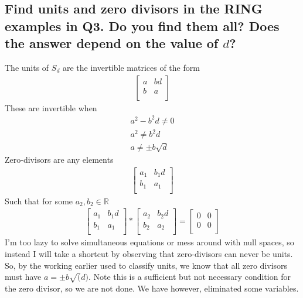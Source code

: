 \documentclass{article}
\begin{document}
\subsection*{Find units and zero divisors in the RING examples in Q3. Do you find them all? Does the answer depend on the value of \(d\)?}
\solution
The units of \(S_d\) are the invertible matrices of the form
\begin{align*}
\left[ {\begin{array}{cc}
   a & bd \\
   b & a \\
  \end{array} } \right]
\end{align*}
These are invertible when
\begin{align*}
a^2 - b^2 d \neq 0\\
a^2 \neq b^2 d\\
a \neq \pm b\sqrt{d}
\end{align*}
Zero-divisors are any elements
\begin{align*}
\left[ {\begin{array}{cc}
   a_1 & b_1 d \\
   b_1 & a_1 \\
  \end{array} } \right]
\end{align*}
Such that for some \(a_2, b_2 \in \mathds{R}\)
\begin{align*}
\left[ {\begin{array}{cc}
   a_1 & b_1 d \\
   b_1 & a_1 \\
  \end{array} } \right] * 
  \left[ {\begin{array}{cc}
   a_2 & b_2 d \\
   b_2 & a_2 \\
  \end{array} } \right] = 
  \left[ {\begin{array}{cc}
   0 & 0 \\
   0 & 0 \\
  \end{array} } \right]
\end{align*}
I'm too lazy to solve simultaneous equations or mess around with null spaces, so instead I will take a shortcut by observing that zero-divisors can never be units. So, by the working earlier used to classify units, we know that all zero divisors must have \(a = \pm b\sqrt(d)\). Note this is a sufficient but not necessary condition for the zero divisor, so we are not done. We have however, eliminated some variables.
\end{document}
